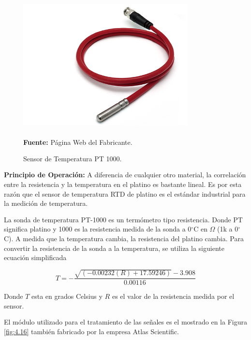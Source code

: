 \begin{figure}[ht]
    \centering
    \includegraphics[width=90mm, height=70mm]{Imagenes/2021/imag39.png}
    \caption[Sensor de Temperatura PT 1000]{Sensor de Temperatura PT 1000. }{\textbf{Fuente: } Página Web del Fabricante. }
    \label{fig:4.15}
\end{figure}


\textbf{Principio de Operación: }
A diferencia de cualquier otro material, la correlación entre la resistencia y la temperatura en el platino es bastante lineal. Es por esta razón que el sensor de temperatura RTD de platino es el estándar industrial para la medición de temperatura.

La sonda de temperatura PT-1000 es un termómetro tipo resistencia. Donde PT significa platino y 1000 es la resistencia medida de la sonda a 0$^{\circ}$C en $\Omega$ (1k a 0$^{\circ}$C).
A medida que la temperatura cambia, la resistencia del platino cambia.
Para convertir la resistencia de la sonda a la temperatura, se utiliza la siguiente ecuación simplificada

\begin{equation}
    T=-\frac{\sqrt{(-0.00232(R)+17.59246)}-3.908}{0.00116}
\end{equation}

Donde $T$ esta en grados Celsius y $R$ es el valor de la resistencia medida por el sensor.

El módulo utilizado para el tratamiento de las señales es el mostrado en la Figura \ref{fig:4.16} también fabricado por la empresa Atlas Scientific.

